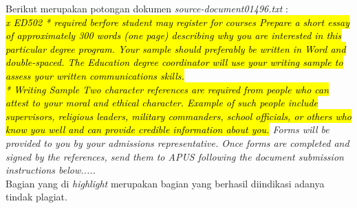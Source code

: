\documentclass[../Book.tex]{subfiles}
\begin{document}
	\noindent Berikut merupakan potongan dokumen \textit{source-document01496.txt} : \\
	
	\textit{\hl{x ED502 * required berfore student may register for courses Prepare a short essay of approximately 300 words (one page) describing why you are interested in this particular degree program. Your sample should preferably be written in Word and double-spaced. The Education degree coordinator will use your writing sample to assess your written communications skills.\\ * Writing Sample Two character references are required from people who can attest to your moral and ethical character. Example of such people include supervisors, religious leaders, military commanders, school officials, or others who know you well and can provide credible information about you.} Forms will be provided to you by your admissions representative. Once forms are completed and signed by the references, send them to APUS following the document submission instructions below.....} \\
	
	\noindent Bagian yang di \textit{highlight} merupakan bagian yang berhasil diindikasi adanya tindak plagiat.
\end{document}
